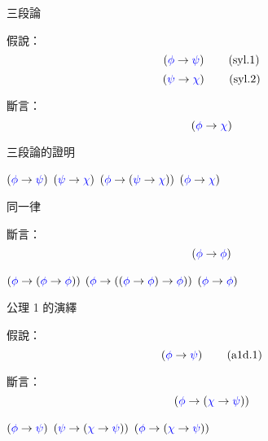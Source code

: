 \documentclass{Slideshow}
\begin{document}
\begin{frame}{三段論}
    \begin{theorem}
        假說：
        \[ \wi\wph\wps \tag{syl.1} \]
        \[ \wi\wps\wch \tag{syl.2} \]

        斷言：
        \[ \wi\wph\wch \]
    \end{theorem}
\end{frame}

\begin{frame}{三段論的證明}
    \begin{mmtable}{2em}{3em}
            $\wi\wph\wps$
            \label{syl:1}
            $\wi\wps\wch$
            \label{syl:2}
            $\wi\wph{\wi\wps\wch}$
            \label{syl:a1i}
            $\wi\wph\wch$
    \end{mmtable}
\end{frame}

\begin{frame}{同一律}
    \begin{theorem}[\mmtarget{id}]
        斷言：
        \[ \wi\wph\wph \]

        \begin{mmtable}{2em}{3em}
                $\axI\wph\wph$
                \label{id:ax-1:1}
                $\axI\wph{\wi\wph\wph}$
                \label{id:ax-1:2}
                $\wi\wph\wph$
        \end{mmtable}
    \end{theorem}
\end{frame}

\begin{frame}{公理 1 的演繹}
    \begin{theorem}[\mmtarget{a1d}]
        假說：
        \[ \wi\wph\wps \tag{a1d.1} \]

        斷言：
        \[ \wi\wph{\wi\wch\wps} \]

        \begin{mmtable}{2em}{4em}
                $\wi\wph\wps$
                \label{a1d:1}
                $\axI\wps\wch$
                \label{a1d:ax-1}
                $\wi\wph{\wi\wch\wps}$
        \end{mmtable}
    \end{theorem}
\end{frame}
\end{document}
